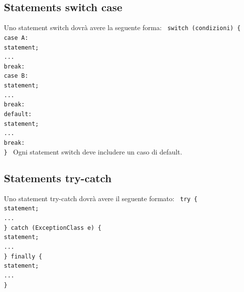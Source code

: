 \documentclass[11pt,titlepage,a4paper]{report}
\begin{document}
\subsection{Statements switch case}
Uno statement switch dovr\`a avere la seguente forma:\newline
\texttt{
	 \newline
	switch (condizioni) \{ \\
	case A:\\
	\phantom{....}statement;\\
	\phantom{....}...\\
	\phantom{....}break:\\
	case B:\\
	\phantom{....}statement;\\
	\phantom{....}...\\
	\phantom{....}break:\\
	default:\\
	\phantom{....}statement;\\
	\phantom{....}...\\
	\phantom{....}break:\\
	\}
}\newline
 \newline
Ogni statement switch deve includere un caso di default.
\subsection{Statements try-catch}
Uno statement try-catch dovr\`a avere il seguente formato:\newline
\texttt{
	 \newline
	try \{ \\
	\phantom{....}statement;\\
	\phantom{....}... \\
	\} catch (ExceptionClass e) \{ \\
	\phantom{....}statement;\\
	\phantom{....}... \\
	\} finally \{ \\
	\phantom{....}statement;\\
	\phantom{....}... \\
	\}
}
\end{document}
